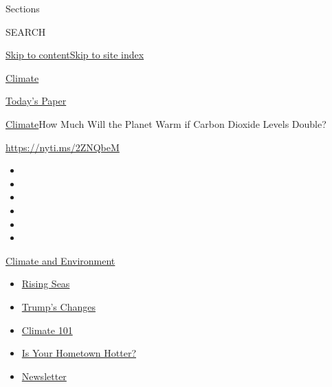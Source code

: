 Sections

SEARCH

\protect\hyperlink{site-content}{Skip to
content}\protect\hyperlink{site-index}{Skip to site index}

\href{https://www.nytimes3xbfgragh.onion/section/climate}{Climate}

\href{https://myaccount.nytimes3xbfgragh.onion/auth/login?response_type=cookie\&client_id=vi}{}

\href{https://www.nytimes3xbfgragh.onion/section/todayspaper}{Today's
Paper}

\href{/section/climate}{Climate}\textbar{}How Much Will the Planet Warm
if Carbon Dioxide Levels Double?

\href{https://nyti.ms/2ZNQbeM}{https://nyti.ms/2ZNQbeM}

\begin{itemize}
\item
\item
\item
\item
\item
\item
\end{itemize}

\href{https://www.nytimes3xbfgragh.onion/section/climate?action=click\&pgtype=Article\&state=default\&region=TOP_BANNER\&context=storylines_menu}{Climate
and Environment}

\begin{itemize}
\tightlist
\item
  \href{https://www.nytimes3xbfgragh.onion/2020/07/30/climate/sea-level-inland-floods.html?action=click\&pgtype=Article\&state=default\&region=TOP_BANNER\&context=storylines_menu}{Rising
  Seas}
\item
  \href{https://www.nytimes3xbfgragh.onion/interactive/2020/climate/trump-environment-rollbacks.html?action=click\&pgtype=Article\&state=default\&region=TOP_BANNER\&context=storylines_menu}{Trump's
  Changes}
\item
  \href{https://www.nytimes3xbfgragh.onion/interactive/2020/04/19/climate/climate-crash-course-1.html?action=click\&pgtype=Article\&state=default\&region=TOP_BANNER\&context=storylines_menu}{Climate
  101}
\item
  \href{https://www.nytimes3xbfgragh.onion/interactive/2018/08/30/climate/how-much-hotter-is-your-hometown.html?action=click\&pgtype=Article\&state=default\&region=TOP_BANNER\&context=storylines_menu}{Is
  Your Hometown Hotter?}
\item
  \href{https://www.nytimes3xbfgragh.onion/newsletters/climate-change?action=click\&pgtype=Article\&state=default\&region=TOP_BANNER\&context=storylines_menu}{Newsletter}
\end{itemize}

